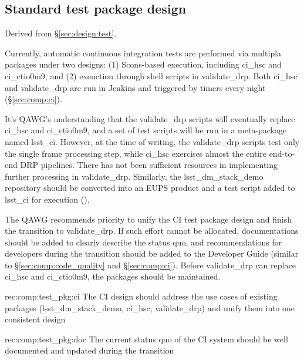 \subsection{Standard test package design}
\label{sec:comp:test_pkg}

Derived from \S\ref{sec:design:test}.


Currently, automatic continuous integration tests are performed via
multipla packages under two designs: (1) Scons-based execution, including
ci\_hsc and ci\_ctio0m9, and (2) exeuction through shell scripts
in validate\_drp.  Both ci\_hsc and validate\_drp are run in
Jenkins and triggered by timers every night (\S\ref{sec:comp:ci}).

It's QAWG's understanding that the validate\_drp scripts will
eventually replace ci\_hsc and ci\_ctio0m9, and a set of test scripts
will be run in a meta-package named lsst\_ci.  However, at the time
of writing, the validate\_drp scripts test only the single frame
processing step, while ci\_hsc exercises almost the entire end-to-end
DRP pipelines.  There has not been sufficient resources in implementing
further processing in validate\_drp.  Similarly, the lsst\_dm\_stack\_demo
repository should be converted into an EUPS product and a test
script added to lsst\_ci for execution ().

The QAWG recommends priority to unify the CI test package design and finish
the transition to validate\_drp. If such effort cannot be allocated,
documentations should be added to clearly describe the status quo, and
recommendations for developers during the transition should be added to the
Developer Guide (similar to \S\ref{sec:comp:code_quality} and
\S\ref{sec:comp:ci}). Before validate\_drp can replace ci\_hsc and
ci\_ctio0m9, the packages should be maintained.


\begin{recommendation}
  {rec:comp:test_pkg:ci}
  {The CI design should address the use cases of existing packages
   (lsst\_dm\_stack\_demo, ci\_hsc, validate\_drp) and unify them into
   one consistent design}
\end{recommendation}
\begin{recommendation}
  {rec:comp:test_pkg:doc}
  {The current status quo of the CI system should be well documented
   and updated during the transition}
\end{recommendation}

